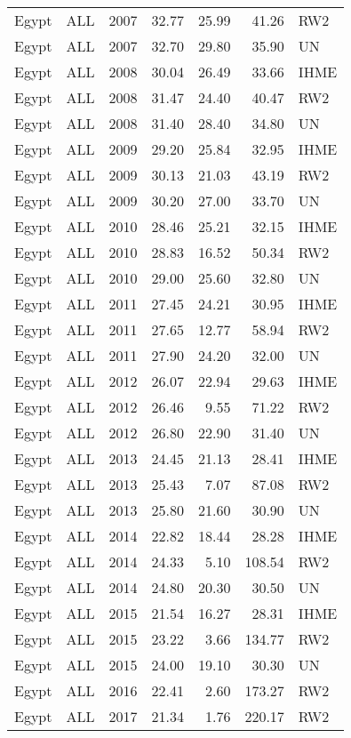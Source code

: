 \begin{longtable}{lllrrrl}
  Egypt & ALL & 2007 & 32.77 & 25.99 & 41.26 & RW2 \\ 
  Egypt & ALL & 2007 & 32.70 & 29.80 & 35.90 & UN \\ 
  Egypt & ALL & 2008 & 30.04 & 26.49 & 33.66 & IHME \\ 
  Egypt & ALL & 2008 & 31.47 & 24.40 & 40.47 & RW2 \\ 
  Egypt & ALL & 2008 & 31.40 & 28.40 & 34.80 & UN \\ 
  Egypt & ALL & 2009 & 29.20 & 25.84 & 32.95 & IHME \\ 
  Egypt & ALL & 2009 & 30.13 & 21.03 & 43.19 & RW2 \\ 
  Egypt & ALL & 2009 & 30.20 & 27.00 & 33.70 & UN \\ 
  Egypt & ALL & 2010 & 28.46 & 25.21 & 32.15 & IHME \\ 
  Egypt & ALL & 2010 & 28.83 & 16.52 & 50.34 & RW2 \\ 
  Egypt & ALL & 2010 & 29.00 & 25.60 & 32.80 & UN \\ 
  Egypt & ALL & 2011 & 27.45 & 24.21 & 30.95 & IHME \\ 
  Egypt & ALL & 2011 & 27.65 & 12.77 & 58.94 & RW2 \\ 
  Egypt & ALL & 2011 & 27.90 & 24.20 & 32.00 & UN \\ 
  Egypt & ALL & 2012 & 26.07 & 22.94 & 29.63 & IHME \\ 
  Egypt & ALL & 2012 & 26.46 & 9.55 & 71.22 & RW2 \\ 
  Egypt & ALL & 2012 & 26.80 & 22.90 & 31.40 & UN \\ 
  Egypt & ALL & 2013 & 24.45 & 21.13 & 28.41 & IHME \\ 
  Egypt & ALL & 2013 & 25.43 & 7.07 & 87.08 & RW2 \\ 
  Egypt & ALL & 2013 & 25.80 & 21.60 & 30.90 & UN \\ 
  Egypt & ALL & 2014 & 22.82 & 18.44 & 28.28 & IHME \\ 
  Egypt & ALL & 2014 & 24.33 & 5.10 & 108.54 & RW2 \\ 
  Egypt & ALL & 2014 & 24.80 & 20.30 & 30.50 & UN \\ 
  Egypt & ALL & 2015 & 21.54 & 16.27 & 28.31 & IHME \\ 
  Egypt & ALL & 2015 & 23.22 & 3.66 & 134.77 & RW2 \\ 
  Egypt & ALL & 2015 & 24.00 & 19.10 & 30.30 & UN \\ 
  Egypt & ALL & 2016 & 22.41 & 2.60 & 173.27 & RW2 \\ 
  Egypt & ALL & 2017 & 21.34 & 1.76 & 220.17 & RW2 \\ 

\end{longtable}
